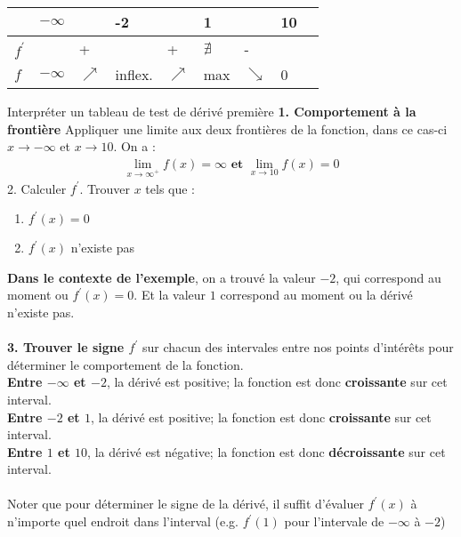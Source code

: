\documentclass{report}
\newcommand{\varitem}[3][black]{%
    \item[%
        \colorbox{#2}{\textcolor{#1}{\makebox(5.5,7){#3}}}%
    ]
}
\begin{document}
\begin{multicols*}{3}
\begin{table}[h]
      \begin{center}
        \renewcommand{\arraystretch}{1.5}
        \selectfont
        \footnotesize
        \begin{tabular}{|l|l|l|l|l|l|l|l|l}
        \arrayrulecolor{blue}\hline
        \rowcolor{lightBlue}
        \textcolor{myb}{} & \textcolor{myb}{ $-\infty$ } & & -2 & & 1 & & 10
        \\
        \hline
        \hline
        \arrayrulecolor{black} 
        $f^{\prime} $ &  & + &  & + & $\nexists$  & - & 
        \\ 
        \hline 
        $f$ & $-\infty$  & $\nearrow$ & inflex. & $\nearrow$ & max & $\searrow$ & 0 
        \\ 
        \hline
      \end{tabular}
    \end{center}
    \end{table}
\begin{EExample}{Interpréter un tableau de test de dérivé première}{}
  \textbf{1. Comportement à la frontière} 
  Appliquer une limite aux deux frontières de la fonction, dans ce cas-ci $x \rightarrow -\infty$ et 
  $x \rightarrow 10$. On a :
  \begin{align*}
    \lim\limits_{x\to\infty^{+}}f(x) = \infty  \textbf{ et }\lim\limits_{x\to 10}f(x) = 0        
  \end{align*}
  2. Calculer $f^{\prime}$. Trouver $x$ tels que :
  \begin{enumerate}
    \varitem{blue!40}{\textbf{1}} $f^{\prime}\left(x\right) = 0$
  \varitem{blue!40}{\textbf{2}} $f^{\prime}\left(x\right)$ n'existe pas  
  \end{enumerate}
  \textbf{Dans le contexte de l'exemple}, on a trouvé la valeur $-2$, qui correspond au moment ou 
  $f^{\prime}\left(x\right) = 0$. Et la valeur $1$ correspond au moment ou la dérivé n'existe pas. \\\\ 
  \textbf{3. Trouver le signe $f^{\prime}$} sur chacun des intervales entre nos points d'intérêts pour déterminer 
  le comportement de la fonction. \\ 
  \textbf{Entre $-\infty$ et $-2$}, la dérivé est positive; la fonction est donc \textbf{croissante} 
  sur cet interval. \\
  \textbf{Entre $-2$ et $1$}, la dérivé est positive; la fonction est donc \textbf{croissante} 
  sur cet interval. \\
  \textbf{Entre $1$ et $10$}, la dérivé est négative; la fonction est donc \textbf{décroissante} 
  sur cet interval. \\\\
Noter que pour déterminer le signe de la dérivé, il suffit d'évaluer $f^{\prime}\left(x\right)$ à n'importe 
quel endroit dans l'interval (e.g.  $f^{\prime}\left(1\right)$  pour l'intervale de $-\infty$ à $-2$)  
\end{EExample}




\end{multicols*}
\end{document}
